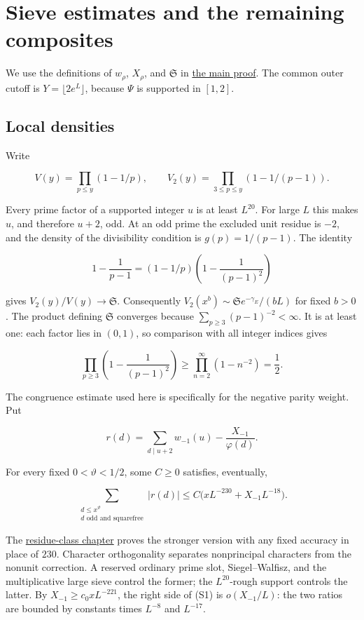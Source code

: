 \hypertarget{sieve}{%
\section{Sieve estimates and the remaining composites}\label{sieve}}

We use the definitions of \(w_\rho\), \(X_\rho\), and \(\mathfrak S\) in
\protect\hyperlink{proof}{the main proof}. The common outer cutoff is
\(Y=\lfloor2e^L\rfloor\), because \(\Psi\) is supported in \([1,2]\).


\hypertarget{sieve-local-densities}{%
\subsection{Local densities}\label{sieve-local-densities}}

Write

\[
V(y)=\prod_{p\le y}(1-1/p),\qquad
V_2(y)=\prod_{3\le p\le y}(1-1/(p-1)).
\]

Every prime factor of a supported integer \(u\) is at least \(L^{20}\).
For large \(L\) this makes \(u\), and therefore \(u+2\), odd. At an odd
prime the excluded unit residue is \(-2\), and the density of the
divisibility condition is \(g(p)=1/(p-1)\). The identity

\[
1-\frac1{p-1}=(1-1/p)\left(1-\frac1{(p-1)^2}\right)
\]

gives \(V_2(y)/V(y)\to\mathfrak S\). Consequently
\(V_2(x^b)\sim\mathfrak S e^{-\gamma_E}/(bL)\) for fixed \(b>0\). The
product defining \(\mathfrak S\) converges because
\(\sum_{p\ge3}(p-1)^{-2}<\infty\). It is at least one: each factor lies
in \((0,1)\), so comparison with all integer indices gives

\[
\prod_{p\ge3}\left(1-\frac1{(p-1)^2}\right)
\ge\prod_{n=2}^{\infty}(1-n^{-2})=\frac12.
\]

The congruence estimate used here is specifically for the negative
parity weight. Put

\[
r(d)=\sum_{d\mid u+2}w_{-1}(u)-\frac{X_{-1}}{\varphi(d)}.
\]

For every fixed \(0<\vartheta<1/2\), some \(C\ge0\) satisfies,
eventually,

\[
\sum_{\substack{d\le x^\vartheta\\d\text{ odd and squarefree}}}|r(d)|
\le C\bigl(xL^{-230}+X_{-1}L^{-18}\bigr). \tag{S1}
\]

The \protect\hyperlink{congruences}{residue-class chapter} proves the
stronger version with any fixed accuracy in place of \(230\). Character
orthogonality separates nonprincipal characters from the nonunit
correction. A reserved ordinary prime slot, Siegel--Walfisz, and the
multiplicative large sieve control the former; the \(L^{20}\)-rough
support controls the latter. By \(X_{-1}\ge c_0xL^{-221}\), the right
side of (S1) is \(o(X_{-1}/L)\): the two ratios are bounded by constants
times \(L^{-8}\) and \(L^{-17}\).


